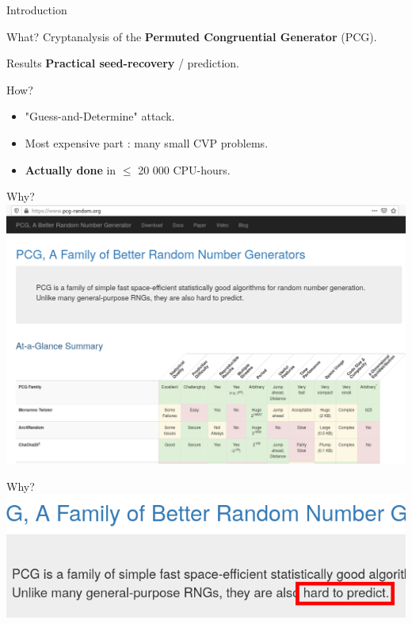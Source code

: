 \begin{frame}[label=intro]{Introduction}
    
    \begin{exampleblock}{What?}
        Cryptanalysis of the \textbf{Permuted Congruential Generator} (PCG).
    \end{exampleblock}
    
    \medskip\pause
    
    \begin{alertblock}{Results}
      \textbf{Practical seed-recovery} / prediction.
    \end{alertblock}
    
    \begin{block}{How?}
    \begin{itemize}
        \item "Guess-and-Determine" attack.
        \item Most expensive part : many small CVP problems.
        \item \textbf{Actually done} in $\leq$ 20 000 CPU-hours.
    \end{itemize}  
    \end{block}
\end{frame}

\begin{frame}{Why?}
    \centering
    \includegraphics[width=\textwidth]{pictures/website.png}
\end{frame}

\begin{frame}{Why?}
    \centering
    \includegraphics[width=\textwidth]{pictures/hard.png}
    \vfill
  \end{frame}

